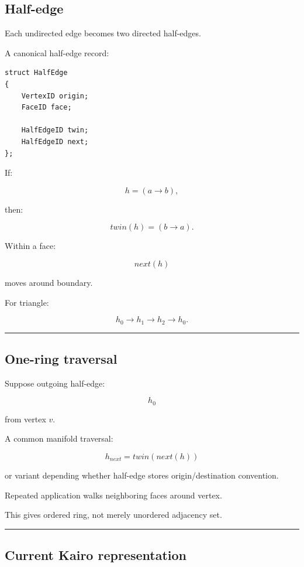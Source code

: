 \subsection{Half-edge}\label{04-visual-computing-ii-ch041-half-edge}

Each undirected edge becomes two directed half-edges.

A canonical half-edge record:

\begin{verbatim}
struct HalfEdge
{
    VertexID origin;
    FaceID face;

    HalfEdgeID twin;
    HalfEdgeID next;
};
\end{verbatim}

If:

\[
h=(a\rightarrow b),
\]

then:

\[
twin(h)
=
(b\rightarrow a).
\]

Within a face:

\[
next(h)
\]

moves around boundary.

For triangle:

\[
h_0\rightarrow h_1\rightarrow h_2\rightarrow h_0.
\]

\begin{center}\rule{0.5\linewidth}{0.5pt}\end{center}

\subsection{One-ring traversal}\label{04-visual-computing-ii-ch041-one-ring-traversal}

Suppose outgoing half-edge:

\[
h_0
\]

from vertex \(v\).

A common manifold traversal:

\[
\boxed{
h_{next}
=
twin(next(h))
}
\]

or variant depending whether half-edge stores origin/destination convention.

Repeated application walks neighboring faces around vertex.

This gives ordered ring, not merely unordered adjacency set.

\begin{center}\rule{0.5\linewidth}{0.5pt}\end{center}

\subsection{Current Kairo representation}\label{04-visual-computing-ii-ch041-current-kairo-representation}

